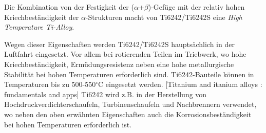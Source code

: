 Die Kombination von der Festigkeit der ($\alpha$+$\beta$)-Gefüge mit der relativ hohen Kriechbeständigkeit der $\alpha$-Strukturen macht von Ti6242/Ti6242S eine \textit{High Temperature Ti-Alloy}.

Wegen dieser Eigenschaften werden Ti6242/Ti6242S hauptsächlich in der Luftfahrt eingesetzt. Vor allem bei rotierenden Teilen im Triebwerk, wo  hohe Kriechbeständigkeit, Ermüdungsresistenz  neben eine hohe metallurgische Stabilität bei hohen Temperaturen erforderlich sind. 
Ti6242-Bauteile können in Temperaturen bis zu 500-550$^\circ$C eingesetzt werden. [Titanium and itanium alloys : fundamentals and apps]
Ti6242 wird z.B. in der Herstellung von Hochdruckverdichterschaufeln, Turbinenschaufeln und Nachbrennern verwendet, wo neben den oben erwähnten Eigenschaften auch die Korrosionsbeständigkeit bei hohen Temperaturen erforderlich ist. \newline



